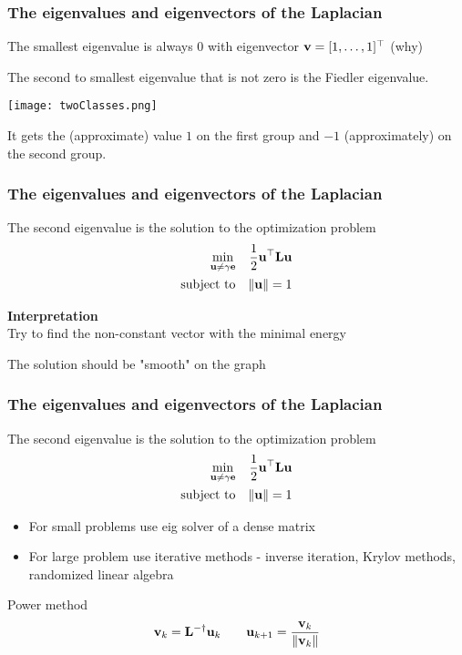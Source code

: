 \documentclass[12pt,fleqn]{beamer}
\begin{document}
\begin{frame}
\frametitle{The eigenvalues and eigenvectors of the Laplacian }

The smallest eigenvalue is always $0$ with eigenvector ${\bf v} = [1,\ldots,1]^{\top}$ (why)


The second to smallest eigenvalue that is not zero is the Fiedler eigenvalue.

\centering
\texttt{[image: twoClasses.png]}

It gets the (approximate) value $1$ on the first group and $-1$ (approximately) on the second group.

\end{frame}

\begin{frame}
\frametitle{The eigenvalues and eigenvectors of the Laplacian }


The second eigenvalue is the solution to the optimization problem
\begin{eqnarray*}
\min_{{\bf u}\not=\gamma{\bf e}} && {\frac 12} {\bf u}^{\top} {\bf L} {\bf u} \\
{\rm subject\ to} && \|{\bf u} \| = 1
\end{eqnarray*}

\bigskip

{\bf Interpretation} \\
Try to find the non-constant vector with the minimal energy 

The solution should be "smooth" on the graph

\end{frame}

\begin{frame}
\frametitle{The eigenvalues and eigenvectors of the Laplacian }


The second eigenvalue is the solution to the optimization problem
\begin{eqnarray*}
\min_{{\bf u}\not=\gamma{\bf e}} && {\frac 12} {\bf u}^{\top} {\bf L} {\bf u} \\
{\rm subject\ to} && \|{\bf u} \| = 1
\end{eqnarray*}


\bigskip

\begin{itemize}
\item
For small problems use eig solver of a dense matrix
\item
For large problem use iterative methods - inverse iteration, Krylov methods, randomized linear algebra
\end{itemize}

\bigskip

Power method
$$ {\bf v}_{k} = {\bf L}^{-\dag} {\bf u}_k \quad \quad {\bf u}_{k+1} = {\frac {{\bf v}_k}{\|{\bf v}_k\|}} $$


\end{frame}
\end{document}
